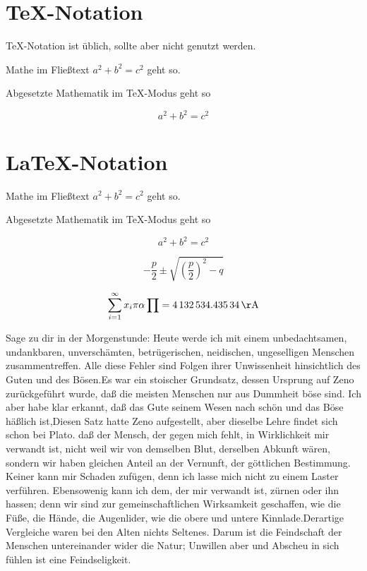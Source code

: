 \documentclass[12pt,ngerman,parskip=half]{scrartcl}
\begin{document}
\blindtext

\section{TeX-Notation}

TeX-Notation ist üblich, sollte aber nicht genutzt werden.

Mathe im Fließtext $a^2+b^2=c^2$ geht so.

Abgesetzte Mathematik im TeX-Modus geht so 

$$a^2+b^2=c^2$$ 

\section{LaTeX-Notation}

Mathe im Fließtext \(a^2+b^2=c^2\) geht so.

Abgesetzte Mathematik im TeX-Modus geht so 

\[a^2+b^2=c^2\] 

\begin{equation}
- \frac{p}{2} \pm \sqrt{\left(\frac{p}{2}\right)^2 - q}
\end{equation}

\begin{equation}
\sum_{i=1}^\infty x_i \pi \alpha \prod = \qty{4132534.43534}{\AA}
\end{equation}


Sage zu dir in der Morgenstunde: Heute werde ich mit einem unbedachtsamen, undankbaren, unverschämten, betrügerischen, neidischen, ungeselligen Menschen zusammentreffen. Alle diese Fehler sind Folgen ihrer Unwissenheit hinsichtlich des Guten und des Bösen.Es war ein stoischer Grundsatz, dessen Ursprung auf Zeno zurückgeführt wurde, daß die meisten Menschen nur aus Dummheit böse sind. Ich aber habe klar erkannt, daß das Gute seinem Wesen nach schön und das Böse häßlich ist,Diesen Satz hatte Zeno aufgestellt, aber dieselbe Lehre findet sich schon bei Plato. daß der Mensch, der gegen mich fehlt, in Wirklichkeit mir verwandt ist, nicht weil wir von demselben Blut, derselben Abkunft wären, sondern wir haben gleichen Anteil an der Vernunft, der göttlichen Bestimmung. Keiner kann mir Schaden zufügen, denn ich lasse mich nicht zu einem Laster verführen. Ebensowenig kann ich dem, der mir verwandt ist, zürnen oder ihn hassen; denn wir sind zur gemeinschaftlichen Wirksamkeit geschaffen, wie die Füße, die Hände, die Augenlider, wie die obere und untere Kinnlade.Derartige Vergleiche waren bei den Alten nichts Seltenes. Darum ist die Feindschaft der Menschen untereinander wider die Natur; Unwillen aber und Abscheu in sich fühlen ist eine Feindseligkeit.
\end{document}
